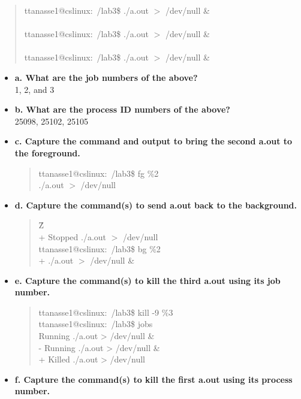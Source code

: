 \documentclass{article}
\begin{document}
\begin{itemize}
  \begin{quote}
    ttanasse1@cslinux:~/lab3\$ ./a.out $>$ /dev/null \&\\ \\
ttanasse1@cslinux:~/lab3\$ ./a.out $>$ /dev/null \&\\ \\
ttanasse1@cslinux:~/lab3\$ ./a.out $>$ /dev/null \&\\ 
  \end{quote}
  \begin{itemize}
    \item \textbf{a. What are the job numbers of the above?}\\
    1, 2, and 3
    \item \textbf{b. What are the process ID numbers of the above?}\\
    25098, 25102, 25105
    \item \textbf{c. Capture the command and output to bring the second a.out to the foreground.}
    \begin{quote}
      ttanasse1@cslinux:~/lab3\$ fg \%2\\
./a.out $>$ /dev/null
    \end{quote}
    \item \textbf{d. Capture the command(s) to send a.out back to the background.}
    \begin{quote}
      \^Z\\ \relax
[2]+  Stopped                 ./a.out $>$ /dev/null\\
ttanasse1@cslinux:~/lab3\$ bg \%2\\ \relax
[2]+ ./a.out $>$ /dev/null \&
    \end{quote}
    \item \textbf{e. Capture the command(s) to kill the third a.out using its job number.}
    \begin{quote}
      ttanasse1@cslinux:~/lab3\$ kill -9 \%3\\
ttanasse1@cslinux:~/lab3\$ jobs\\ \relax
[1]   Running                 ./a.out > /dev/null \&\\ \relax
[2]-  Running                 ./a.out > /dev/null \&\\ \relax
[3]+  Killed                  ./a.out > /dev/null 
    \end{quote}
    \item \textbf{f. Capture the command(s) to kill the first a.out using its process number.}
    \begin{quote}

\end{quote}
\end{itemize}
\end{itemize}
\end{document}
